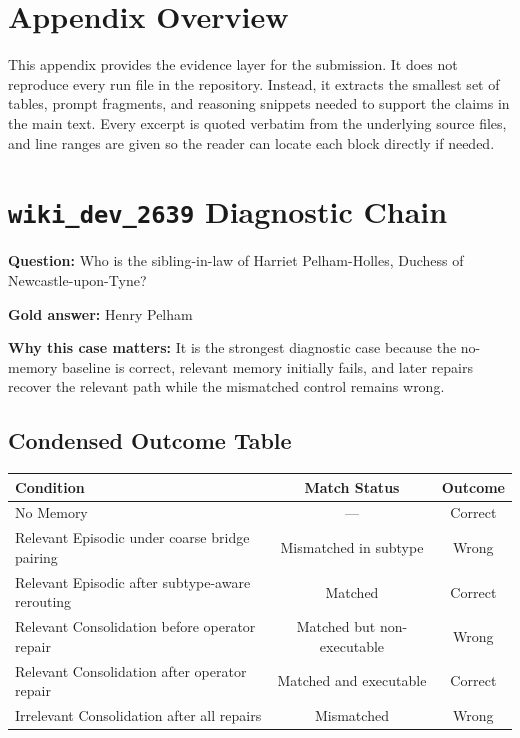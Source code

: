 \clearpage
\section*{Appendix Overview}

This appendix provides the evidence layer for the submission. It does not reproduce every run file in the repository. Instead, it extracts the smallest set of tables, prompt fragments, and reasoning snippets needed to support the claims in the main text. Every excerpt is quoted verbatim from the underlying source files, and line ranges are given so the reader can locate each block directly if needed.

\section{\texttt{wiki\_dev\_2639} Diagnostic Chain}
\label{app:wiki-dev-2639}

\textbf{Question:} Who is the sibling-in-law of Harriet Pelham-Holles, Duchess of Newcastle-upon-Tyne?

\textbf{Gold answer:} Henry Pelham

\textbf{Why this case matters:} It is the strongest diagnostic case because the no-memory baseline is correct, relevant memory initially fails, and later repairs recover the relevant path while the mismatched control remains wrong.

\subsection{Condensed Outcome Table}

\begin{center}
\begin{tabularx}{\textwidth}{Y c c}
\toprule
Condition & Match Status & Outcome \\
\midrule
No Memory & --- & Correct \\
Relevant Episodic under coarse bridge pairing & Mismatched in subtype & Wrong \\
Relevant Episodic after subtype-aware rerouting & Matched & Correct \\
Relevant Consolidation before operator repair & Matched but non-executable & Wrong \\
Relevant Consolidation after operator repair & Matched and executable & Correct \\
Irrelevant Consolidation after all repairs & Mismatched & Wrong \\
\bottomrule
\end{tabularx}
\end{center}

